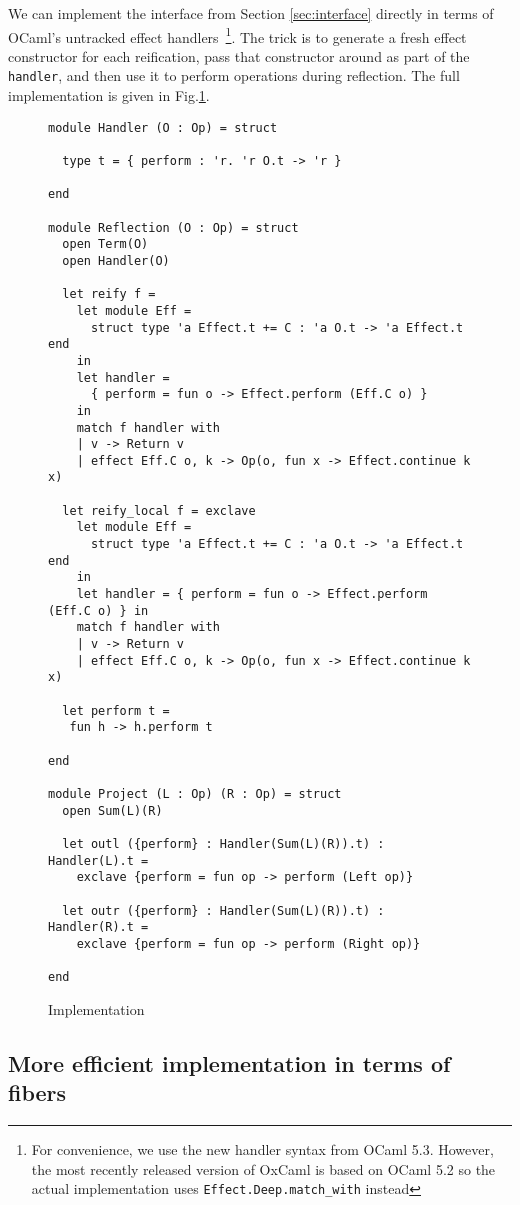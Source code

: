 \documentclass[acmsmall, screen, review, anonymous]{acmart}
\theoremstyle{definition}
\begin{document}
We can implement the interface from Section \ref{sec:interface} directly
in terms of OCaml's untracked effect
handlers~\cite{Sivaramakrishnan2021retrofitting}\footnote{For
  convenience, we use the new handler syntax from OCaml 5.3. However,
  the most recently released version of OxCaml is based on OCaml 5.2 so
  the actual implementation uses
  \lstinline[style=oxcaml]{Effect.Deep.match_with} instead}. The trick
is to generate a fresh effect constructor for each reification, pass
that constructor around as part of the
\lstinline[style=oxcaml]{handler}, and then use it to perform operations
during reflection. The full implementation is given in
Fig.\ref{fig:implementation}.

\begin{figure}
\begin{lstlisting}[style=oxcaml]
module Handler (O : Op) = struct

  type t = { perform : 'r. 'r O.t -> 'r }

end

module Reflection (O : Op) = struct
  open Term(O)
  open Handler(O)

  let reify f =
    let module Eff =
      struct type 'a Effect.t += C : 'a O.t -> 'a Effect.t end
    in
    let handler =
      { perform = fun o -> Effect.perform (Eff.C o) }
    in
    match f handler with
    | v -> Return v
    | effect Eff.C o, k -> Op(o, fun x -> Effect.continue k x)

  let reify_local f = exclave
    let module Eff =
      struct type 'a Effect.t += C : 'a O.t -> 'a Effect.t end
    in
    let handler = { perform = fun o -> Effect.perform (Eff.C o) } in
    match f handler with
    | v -> Return v
    | effect Eff.C o, k -> Op(o, fun x -> Effect.continue k x)

  let perform t =
   fun h -> h.perform t

end

module Project (L : Op) (R : Op) = struct
  open Sum(L)(R)

  let outl ({perform} : Handler(Sum(L)(R)).t) : Handler(L).t =
    exclave {perform = fun op -> perform (Left op)}

  let outr ({perform} : Handler(Sum(L)(R)).t) : Handler(R).t =
    exclave {perform = fun op -> perform (Right op)}

end
\end{lstlisting}
\caption{Implementation}
\label{fig:implementation}
\end{figure}

\subsection{More efficient implementation in terms of fibers}
\end{document}
